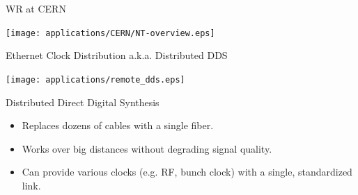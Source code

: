 \documentclass[compress,red]{beamer}
\begin{document}
\begin{frame}{WR at CERN}

    \begin{center}
      \texttt{[image: applications/CERN/NT-overview.eps]}
    \end{center}

\end{frame}
\begin{frame}{Ethernet Clock Distribution a.k.a. Distributed DDS}
  \begin{center}
    \texttt{[image: applications/remote\_dds.eps]}
  \end{center}
  \begin{block}{Distributed Direct Digital Synthesis}
    \begin{itemize}
    \item Replaces dozens of cables with a single fiber.
    \item Works over big distances without degrading signal quality.
    \item Can provide various clocks (e.g. RF, bunch clock) with a single, standardized link.
    \end{itemize}
  \end{block}
\end{frame}
\end{document}
